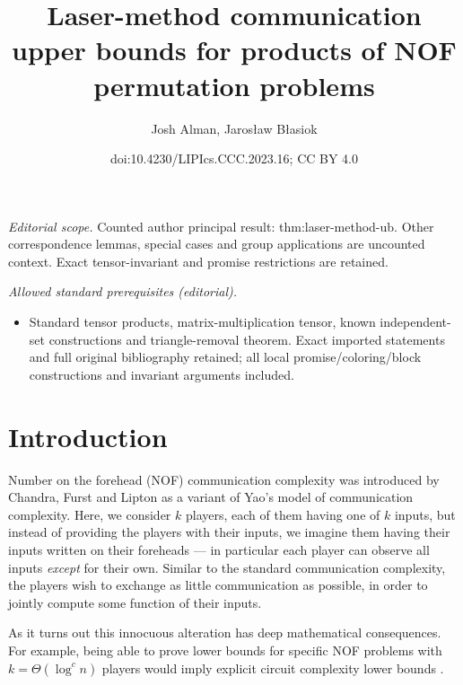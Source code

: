 \documentclass[10pt,a4paper]{article}
\title{Laser-method communication upper bounds for products of NOF permutation problems}
\author{Josh Alman, Jarosław Błasiok}
\date{doi:10.4230/LIPIcs.CCC.2023.16; CC BY 4.0}
\newcommand{\jnote}[1]{\todo[inline, color=blue!30!white]{#1 \\ -\textsc{Jarek}}}
\newcommand{\joshnote}[1]{\todo[inline, color=red!30!white]{#1 \\ -\textsc{Josh}}}
\begin{document}
\maketitle
\noindent\textit{Editorial scope.} Counted author principal result: thm:laser-method-ub. Other correspondence lemmas, special cases and group applications are uncounted context. Exact tensor-invariant and promise restrictions are retained.\par\medskip
\noindent\textit{Allowed standard prerequisites (editorial).}\begin{itemize}
\item Standard tensor products, matrix-multiplication tensor, known independent-set constructions and triangle-removal theorem. Exact imported statements and full original bibliography retained; all local promise/coloring/block constructions and invariant arguments included.
\end{itemize}\medskip
\section{Introduction}


Number on the forehead (NOF) communication complexity was introduced by Chandra, Furst and Lipton \cite{CFL83} as a variant of Yao's model of communication complexity. Here, we consider $k$ players, each of them having one of $k$ inputs, but instead of providing the players with their inputs, we imagine them having their inputs written on their foreheads --- in particular each player can observe all inputs \emph{except} for their own. Similar to the standard communication complexity, the players wish to exchange as little communication as possible, in order to jointly compute some function of their inputs.

As it turns out this innocuous alteration has deep mathematical consequences. For example, being able to prove lower bounds for specific NOF problems with $k = \Theta(\log^c n)$ players would imply explicit circuit complexity lower bounds \cite{HG90,BT94}.
\end{document}
